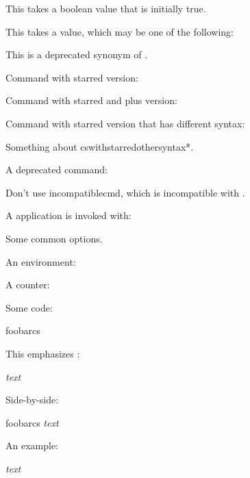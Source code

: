 \documentclass[titlepage=false,oneside,
 fontsize=12pt,captions=tableheading]{scrbook}
\begin{document}
This takes a boolean value that is initially true.

This takes a value, which may be one of the following:


This is a deprecated synonym of
.

Command with starred version:


Command with starred and plus version:


Command with starred version that has different syntax:


Something about \gls{cswithstarredothersyntax*}.

A deprecated command:


Don't use \gls{incompatiblecmd}, which is incompatible with
.

A  application  is invoked with:

Some common options.


An environment:

A counter:

Some code:
\begin{codebox}
\gls{foobarcs}
\end{codebox}
This emphasizes :
\begin{resultbox}
\emph{text}
\end{resultbox}

Side-by-side:
\begin{coderesult}
\gls{foobarcs}
\tcblower
\emph{text}
\end{coderesult}

An example:
\begin{resultbox}
\createexample[title={An example},
 description={A document with the word `text' emphasized},
 label={ex:sample}]
{}
{\emph{text}}
\end{resultbox}

\backmatter
\printterms
\printsummary
{}
\printuserguideindex
\end{document}
